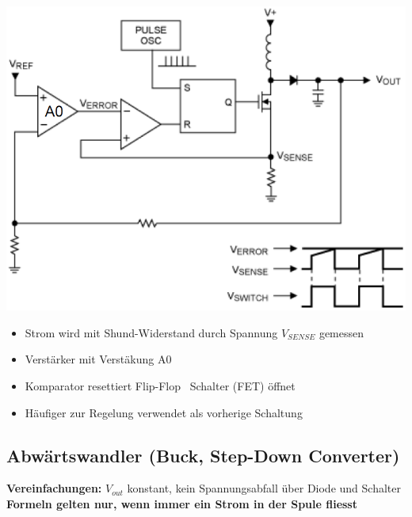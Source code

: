 \begin{minipage}{0.42\columnwidth}
    \includegraphics[width=\columnwidth]{images/regelung_ausgangsspannung_current.png}
\end{minipage}
\hfill
\begin{minipage}{0.56\columnwidth}
    \begin{itemize}
        \item Strom wird mit Shund-Widerstand durch Spannung $V_{SENSE}$ gemessen
        \item Verstärker mit Verstäkung A0
        \item Komparator resettiert Flip-Flop \textrightarrow\ Schalter (FET) öffnet
        \item Häufiger zur Regelung verwendet als vorherige Schaltung
    \end{itemize}
\end{minipage}


\subsection{Abwärtswandler (Buck, Step-Down Converter)}

\begin{minipage}[c]{0.4\columnwidth}
    
\end{minipage}
\hfill
\begin{minipage}[c]{0.58\columnwidth}
    
\end{minipage}

\vspace{0.2cm}
\textbf{Vereinfachungen:} $V_{out}$ konstant, kein Spannungsabfall über Diode und Schalter \\
\textbf{Formeln gelten nur, wenn immer ein Strom in der Spule fliesst}
\vspace{0.2cm}

